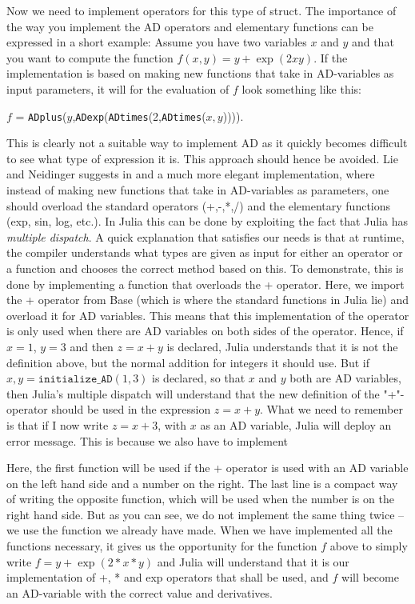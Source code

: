 Now we need to implement operators for this type of struct. The importance of the way you implement the AD operators and elementary functions can be expressed in a short example: Assume you have two variables $x$ and $y$ and that you want to compute the function $f(x,y) = y+\exp(2xy)$. If the implementation is based on making new functions that take in AD-variables as input parameters, it will for the evaluation of $f$ look something like this: 
\begin{center}
    $f$ = \texttt{ADplus}($y$,\texttt{ADexp}(\texttt{ADtimes}(2,\texttt{ADtimes}($x,y$)))).
\end{center}
This is clearly not a suitable way to implement AD as it quickly becomes difficult to see what type of expression it is. This approach should hence be avoided. Lie and Neidinger suggests in \emph{\citep{lieMrstUrl}} and \emph{\citep{doi:10.1137/080743627}} a much more elegant implementation, where instead of making new functions that take in AD-variables as parameters, one should overload the standard operators (+,-,*,/) and the elementary functions (exp, sin, log, etc.). In Julia this can be done by exploiting the fact that Julia has \emph{multiple dispatch}. A quick explanation that satisfies our needs is that at runtime, the compiler understands what types are given as input for either an operator or a function and chooses the correct method based on this. To demonstrate, this is done by implementing a function  
that overloads the + operator. Here, we import the + operator from Base (which is where the standard functions in Julia lie) and overload it for AD variables. This means that this implementation of the operator is only used when there are AD variables on both sides of the operator. Hence, if $x = 1$, $y = 3$ and then $z = x+y$ is declared, Julia understands that it is not the definition above, but the normal addition for integers it should use. But if $x,y = \texttt{initialize\_AD}(1,3)$ is declared, so that $x$ and $y$ both are AD variables, then Julia's multiple dispatch will understand that the new definition of the "+"-operator should be used in the expression $z = x+y$. What we need to remember is that if I now write $z = x + 3$, with $x$ as an AD variable, Julia will deploy an error message. This is because we also have to implement

Here, the first function will be used if the + operator is used with an AD variable on the left hand side and a number on the right. The last line is a compact way of writing the opposite function, which will be used when the number is on the right hand side. But as you can see, we do not implement the same thing twice -- we use the function we already have made. When we have implemented all the functions necessary, it gives us the opportunity for the function $f$ above to simply write $f = y+\exp(2*x*y)$ and Julia will understand that it is our implementation of +, * and exp operators that shall be used, and $f$ will become an AD-variable with the correct value and derivatives. 

